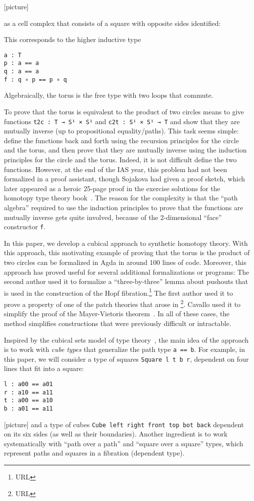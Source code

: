 [picture]

as a cell complex that consists of a square with opposite sides
identified:

This corresponds to the higher inductive type
\begin{verbatim}
a : T
p : a == a
q : a == a
f : q ∘ p == p ∘ q
\end{verbatim}
Algebraically, the torus is the free type with two loops that commute.

To prove that the torus is equivalent to the product of two circles
means to give functions \verb|t2c : T → S¹ × S¹| and
\verb|c2t : S¹ × S¹ → T| and show that they are mutually inverse (up to
propositional equality/paths).  This task seems simple: define the
functions back and forth using the recursion principles for the circle
and the torus, and then prove that they are mutually inverse using the
induction principles for the circle and the torus.  Indeed, it is not
difficult define the two functions.  However, at the end of the IAS
year, this problem had not been formalized in a proof assistant, though
Sojakova had given a proof sketch, which later appeared as a heroic
25-page proof in the exercise solutions for the homotopy type theory
book~\citep{uf13hott-book}.  The reason for the complexity is that the
``path algebra'' required to use the induction principles to prove that
the functions are mutually inverse gets quite involved, because of the
2-dimensional ``face'' constructor \verb|f|.

In this paper, we develop a cubical approach to synthetic homotopy
theory.  With this approach, this motivating example of proving that the
torus is the product of two circles can be formalized in Agda in around
100 lines of code.  Moreover, this approach has proved useful for
several additional formalizations or programs: The second author used it
to formalize a ``three-by-three'' lemma about pushouts that is used in
the construction of the Hopf fibration.\footnote{URL} The first author
used it to prove a property of one of the patch theories that arose in
\citep{amlh14patch}\footnote{URL}.  Cavallo used it to simplify the
proof of the Mayer-Vietoris theorem~\citep{cavallo}.  In all of these
cases, the method simplifies constructions that were previously
difficult or intractable. 

Inspired by the cubical sets model of type
theory~\citep{coquand+13cubical}, the main idea of the approach is to
work with \emph{cube types} that generalize the path type \verb|a == b|.
For example, in this paper, we will consider a type of squares
\verb|Square l t b r|, dependent on four lines that fit into a square:
\begin{verbatim}
l : a00 == a01
r : a10 == a11
t : a00 == a10
b : a01 == a11
\end{verbatim}
[picture] and a type of cubes \verb|Cube left right front top bot back|
dependent on its six sides (as well as their boundaries).  Another
ingredient is to work systematically with ``path over a path'' and
``square over a square'' types, which represent paths and squares in a
fibration (dependent type).

